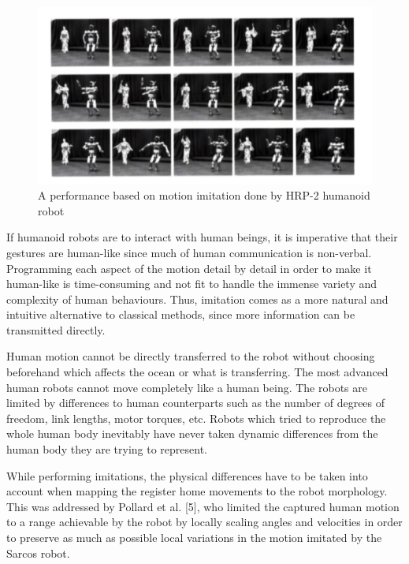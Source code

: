 \begin{figure}[h!]
\centering
\includegraphics[scale=0.9]{images/motion-imitation.png}\hfill
\caption[A motion imitation performance by HRP-2 humanoid robot]{A performance  based on motion imitation done by 
HRP-2 humanoid robot}\hfill
\label{marker-based-system}
\end{figure}


If humanoid robots are to interact with human beings, it is imperative that their gestures are human-like since much of
human communication is non-verbal. Programming each aspect of the motion detail by detail in order to make it human-like
is time-consuming and not fit to handle the immense variety and complexity of human behaviours. Thus, imitation comes
as a more natural and intuitive alternative to classical methods, since more information can be transmitted directly.

 

Human motion cannot be directly transferred to the robot without choosing beforehand which affects the ocean or what
is transferring. The most advanced human robots cannot move completely like a human being. The robots are limited 
by differences to human counterparts such as the number of degrees of freedom, link lengths, motor torques, etc. 
Robots which tried to reproduce the whole human body inevitably have never taken dynamic differences from the human 
body they are trying to represent.

 

While performing imitations, the physical differences have to be taken into account when mapping the register home 
movements to the robot morphology. This was addressed by Pollard et al. [5], who limited the captured human motion 
to a range achievable by the robot by locally scaling angles and velocities in order to preserve as much as possible 
local variations in the motion imitated by the Sarcos robot.


